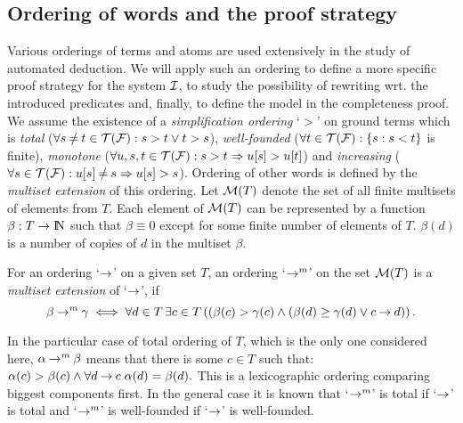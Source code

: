 \subsection{Ordering of words and the proof strategy}

Various orderings of terms and atoms are used extensively in the study of 
automated deduction. We will apply such an ordering to define a more specific
proof strategy for the system $\mbox{$\cal I$}$, to study the possibility of rewriting
wrt. the introduced predicates and, finally, to define the model in the
completeness proof. We assume the existence of 
a {\em simplification ordering} `$>$' \cite{Der} on ground terms which is
{\em total} (\(\forall s\Not=t\in\Terms\Funcs : s>t\lor t>s\)), 
{\em well-founded} (\(\forall t\in{\cal T}({\cal F}) : \{s:s<t\}\) is finite), 
{\em monotone} (\(\forall u,s,t\in{\cal T}({\cal F}) :s>t\Rightarrow u[s]>u[t]\)) 
and 
{\em increasing} (\(\forall s\in\Terms\Funcs : u[s]\Not= s \Rightarrow u[s]>s\)).
Ordering of other words is defined by the {\em multiset extension} \cite{DM} of this
ordering.
Let
${\cal M}(T)$ denote the set of all finite multisets of elements from $T$. Each
element of ${\cal M}(T)$ can be represented by a function \(\beta:T\to {{\rm I\hspace{-.2em}N}}\)
such that \(\beta\equiv 0\) except for some finite number of elements of $T$.
\(\beta(d)\) is a number of copies of $d$ in the multiset $\beta$.
\begin{DEFINITION} \label{def:multiset-ordering}
For an ordering `$\mathbin{\rightarrow}$' on a given set $T$, an ordering `\(\mathbin{\mathord{\mathbin{\rightarrow}}^m}\)' on the
set \({\cal M}(T)\) is a {\em multiset extension} of `$\mathbin{\rightarrow}$', if
\[\beta\mathbin{\mathord{\mathbin{\rightarrow}}^m}\gamma\iff\forall d\in  T\,\exists c\in T\/ \left((\beta(c)>\gamma(c)
\land (\beta(d)\geq \gamma(d) \lor c\mathbin{\rightarrow} d)\right).\]
\end{DEFINITION}
In the particular case of total ordering of $T$,
which is the only one considered here, \(\alpha\mathbin{\mathord{\mathbin{\rightarrow}}^m}\beta\) 
means that there is some $c\in T$ such that:
\(\alpha(c)>\beta(c)\land \forall d\mathbin{\rightarrow} c\; \alpha(d)=\beta(d).\)
This is a lexicographic ordering comparing biggest components first. In the
general case it is known \cite{DM} that `$\mathbin{\mathord{\mathbin{\rightarrow}}^m}$' is total if `$\mathbin{\rightarrow}$' is
total and `$\mathbin{\mathord{\mathbin{\rightarrow}}^m}$' is well-founded if `$\mathbin{\rightarrow}$' is well-founded.

